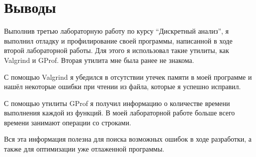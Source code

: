 \section{Выводы}
Выполнив третью лабораторную работу по курсу \enquote{Дискретный анализ}, я выполнил отладку и профилирование
своей программы, написанной в ходе второй лабораторной работы. Для этого я использовал такие утилиты, как 
Valgrind и GProf. Вторая утилита мне была ранее не знакома.

С помощью Valgrind я убедился в отсутствии утечек памяти в моей программе и нашёл некоторые ошибки
при чтении из файла, которые я успешно исправил.

С помощью утилиты GProf я получил информацию о количестве времени выполнения каждой из функций.
В моей лабораторной работе больше всего времени занимают операции со строками.

Вся эта информация полезна для поиска возможных ошибок в ходе разработки, а также для 
оптимизации уже отлаженной программы.
\pagebreak

